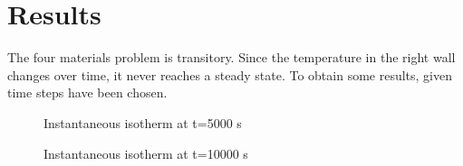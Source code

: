 \section{Results}
The four materials problem is transitory. Since the temperature in the right wall changes over time, it never reaches a steady state. To obtain some results, given time steps have been chosen.
\begin{figure}[h]
	\centering
	
	\caption{Instantaneous isotherm at t=5000 s}
\end{figure}
\begin{figure}[h]
	\centering
	
	\caption{Instantaneous isotherm at t=10000 s}
\end{figure}